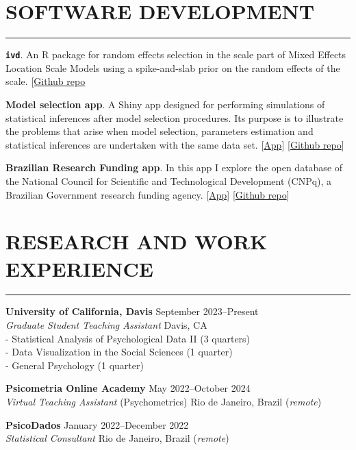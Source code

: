 \documentclass[10pt,]{article}
\begin{document}
\section{SOFTWARE DEVELOPMENT}\label{software-development}

\hrule

\textbf{\texttt{ivd}}. An R package for random effects selection in the
scale part of Mixed Effects Location Scale Models using a spike-and-slab
prior on the random effects of the scale.
{[}\href{https://github.com/consistentlyBetter/ivd}{Github repo}

\textbf{Model selection app}. A Shiny app designed for performing
simulations of statistical inferences after model selection procedures.
Its purpose is to illustrate the problems that arise when model
selection, parameters estimation and statistical inferences are
undertaken with the same data set.
{[}\href{https://marwin.shinyapps.io/model-selection-app/}{App}{]}
{[}\href{https://github.com/marwincarmo/model-selection-app}{Github
repo}{]}

\textbf{Brazilian Research Funding app}. In this app I explore the open
database of the National Council for Scientific and Technological
Development (CNPq), a Brazilian Government research funding agency.
{[}\href{https://marwin.shinyapps.io/bolsas-cnpq/}{App}{]}
{[}\href{https://github.com/marwincarmo/shiny-bolsas}{Github repo}{]}

\section{RESEARCH AND WORK
EXPERIENCE}\label{research-and-work-experience}

\hrule

\textbf{University of California, Davis} \hfill September
2023--Present\\
\emph{Graduate Student Teaching Assistant} \hfill Davis, CA\\
- Statistical Analysis of Psychological Data II (3 quarters)\\
- Data Visualization in the Social Sciences (1 quarter)\\
- General Psychology (1 quarter)

\textbf{Psicometria Online Academy} \hfill May 2022--October 2024\\
\emph{Virtual Teaching Assistant} (Psychometrics) \hfill Rio de Janeiro,
Brazil (\emph{remote})

\textbf{PsicoDados} \hfill January 2022--December 2022\\
\emph{Statistical Consultant} \hfill Rio de Janeiro, Brazil
(\emph{remote})
\end{document}
